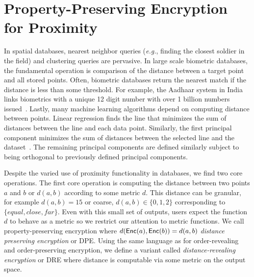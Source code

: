 
\section{Property-Preserving Encryption for Proximity}
\label{sec:ppe}

In spatial databases, nearest neighbor queries (\emph{e.g.}, finding the closest soldier in the field) and clustering queries are pervasive.  %
In large scale biometric databases, the fundamental operation is comparison of the distance between a target point and all stored points. Often, biometric databases return the nearest match if the distance is less than some threshold.  For example, the Aadhaar system in India links biometrics with a unique 12 digit number with over 1 billion numbers issued~\cite{daugman2014600}.  Lastly, many machine learning algorithms depend on computing distance between points. Linear regression finds the line that minimizes the sum of distances between the line and each data point.  Similarly, the first principal component minimizes the sum of distances between the selected line and the dataset~\cite{wold1987principal}.  The remaining principal components are defined similarly subject to being orthogonal to previously defined principal components.

Despite the varied use of proximity functionality in databases, we find two core operations.     The first core operation is computing the distance between two points $a$ and $b$ or $d(a,b)$ according to some metric $d$.  This distance can be granular, for example $d(a, b) =15$ or coarse, $d(a,b)\in\{0,1,2\}$ corresponding to $\{equal, close, far\}$.  Even with this small set of outputs, users expect the function $d$ to behave as a metric so we restrict our attention to metric functions.  We call property-preserving encryption where $d(\mathsf{Enc}(a), \mathsf{Enc}(b)) = d(a,b)$ \emph{distance preserving encryption} or DPE.  Using the same language as for order-revealing and order-preserving encryption, we define a variant called \emph{distance-revealing encryption} or DRE where distance is computable  via some metric on the output space.


